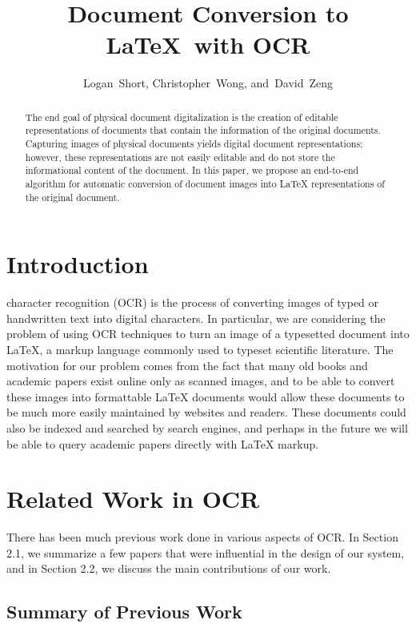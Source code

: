 \documentclass[10pt]{IEEEtran}
\newcommand{\latex}{\LaTeX\xspace}
\begin{document}
\title{Document Conversion to \latex\ with OCR}
\author{Logan~Short, Christopher~Wong, and~David~Zeng}%
\maketitle

\begin{abstract}
The end goal of physical document digitalization is the creation of editable representations of documents that contain the information of the original documents. Capturing images of physical documents yields digital document representations; however, these representations are not easily editable and do not store the informational content of the document. In this paper, we propose an end-to-end algorithm for automatic conversion of document images into \latex representations of the original document.
\end{abstract}

\section{Introduction}

 character recognition (OCR) is the process of converting images of typed or handwritten text into digital characters. In particular, we are considering the problem of using OCR techniques to turn an image of a typesetted document into \latex, a markup language commonly used to typeset scientific literature. The motivation for our problem comes from the fact that many old books and academic papers exist online only as scanned images, and to be able to convert these images into formattable \latex documents would allow these documents to be much more easily maintained by websites and readers. These documents could also be indexed and searched by search engines, and perhaps in the future we will be able to query academic papers directly with \latex markup.

\section{Related Work in OCR}

There has been much previous work done in various aspects of OCR. In Section 2.1, we summarize a few papers that were influential in the design of our system, and in Section 2.2, we discuss the main contributions of our work.

\subsection{Summary of Previous Work}
\end{document}
